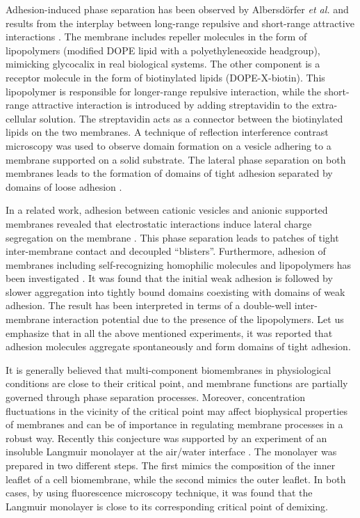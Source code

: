 Adhesion-induced phase separation has been observed
by Albersd\"orfer {\it et al.} and results from the interplay
between long-range repulsive and short-range attractive interactions
\cite{AFS,ABS}.
The membrane includes repeller molecules in the form of
lipopolymers (modified DOPE lipid with a polyethyleneoxide headgroup),
mimicking glycocalix in real biological systems. The other component
is a receptor molecule in the form of biotinylated lipids (DOPE-X-biotin).
This  lipopolymer is responsible for longer-range repulsive interaction,
while the short-range attractive interaction is introduced
by adding streptavidin to the extra-cellular solution. The streptavidin
acts as a connector between the biotinylated lipids on the two membranes.
%
A technique of reflection interference contrast microscopy \cite{RFSS}
was used to observe domain formation on a vesicle adhering to a membrane
supported on a solid substrate.
The lateral phase separation
on both membranes leads to the formation of domains of tight adhesion
separated by domains of loose adhesion \cite{AFS,ABS}.


In a related work, adhesion between cationic vesicles and
anionic supported membranes revealed that electrostatic interactions
induce lateral charge segregation on the membrane \cite{NFBS,NBS}.
This phase separation leads to patches of tight inter-membrane
contact and decoupled
``blisters''.
Furthermore, adhesion of membranes including self-recognizing
homophilic molecules and lipopolymers has been investigated
\cite{BBS}.
It was found that the initial weak adhesion is followed by slower
aggregation into tightly bound domains coexisting  with
domains of weak adhesion.
The result has been interpreted in terms of a double-well
inter-membrane interaction potential due to the presence of
the lipopolymers.
Let us emphasize that
in all the above mentioned experiments, it was
reported that adhesion molecules aggregate
spontaneously and form domains of tight adhesion.


It is generally believed that multi-component biomembranes
in physiological conditions are close to their
critical point, and membrane functions are partially governed through
phase separation processes.
Moreover, concentration fluctuations in the vicinity of the critical
point may affect biophysical properties of membranes and
can be of importance in regulating membrane processes in a robust way.
Recently this conjecture was supported by an experiment of an
insoluble Langmuir monolayer at the air/water interface \cite{KPHM,KM}.
The monolayer was prepared in two different steps.
The first mimics the composition of the inner leaflet of a cell
biomembrane, while the second mimics the outer leaflet.
In both cases, by using fluorescence microscopy technique, it was found
that the Langmuir monolayer is close to its corresponding critical point
of demixing.


